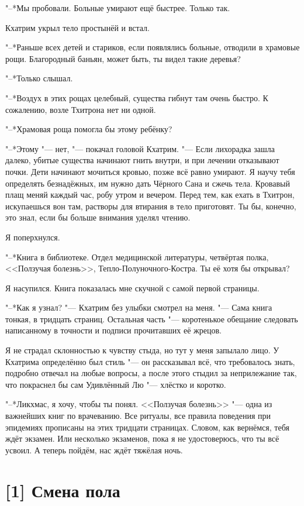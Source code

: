 "--*Мы пробовали.
Больные умирают ещё быстрее.
Только так.

Кхатрим укрыл тело простынёй и встал.

"--*Раньше всех детей и стариков, если появлялись больные, отводили в храмовые рощи.
Благородный баньян, может быть, ты видел такие деревья?

"--*Только слышал.

"--*Воздух в этих рощах целебный, существа гибнут там очень быстро.
К сожалению, возле Тхитрона нет ни одной.

"--*Храмовая роща помогла бы этому ребёнку?

"--*Этому "--- нет, "--- покачал головой Кхатрим.
"--- Если лихорадка зашла далеко, убитые существа начинают гнить внутри, и при лечении отказывают почки.
Дети начинают мочиться кровью, позже всё равно умирают.
Я научу тебя определять безнадёжных, им нужно дать Чёрного Сана и сжечь тела.
Кровавый плащ меняй каждый час, робу утром и вечером.
Перед тем, как ехать в Тхитрон, искупаешься вон там, растворы для втирания в тело приготовят.
Ты бы, конечно, это знал, если бы больше внимания уделял чтению.

Я поперхнулся.

"--*Книга в библиотеке.
Отдел медицинской литературы, четвёртая полка, <<Ползучая болезнь>>, Тепло-Полуночного-Костра.
Ты её хотя бы открывал?

Я насупился.
Книга показалась мне скучной с самой первой страницы.

"--*Как я узнал? "--- Кхатрим без улыбки смотрел на меня.
"--- Сама книга тонкая, в тридцать страниц.
Остальная часть "--- коротенькое обещание следовать написанному в точности и подписи прочитавших её жрецов.

Я не страдал склонностью к чувству стыда, но тут у меня запылало лицо.
У Кхатрима определённо был стиль "--- он рассказывал всё, что требовалось знать, подробно отвечал на любые вопросы, а после этого стыдил за неприлежание так, что покраснел бы сам Удивлённый Лю "--- хлёстко и коротко.

"--*Ликхмас, я хочу, чтобы ты понял.
<<Ползучая болезнь>> "--- одна из важнейших книг по врачеванию.
Все ритуалы, все правила поведения при эпидемиях прописаны на этих тридцати страницах.
Словом, как вернёмся, тебя ждёт экзамен.
Или несколько экзаменов, пока я не удостоверюсь, что ты всё усвоил.
А теперь пойдём, нас ждёт тяжёлая ночь.

\section{[1] Смена пола}

